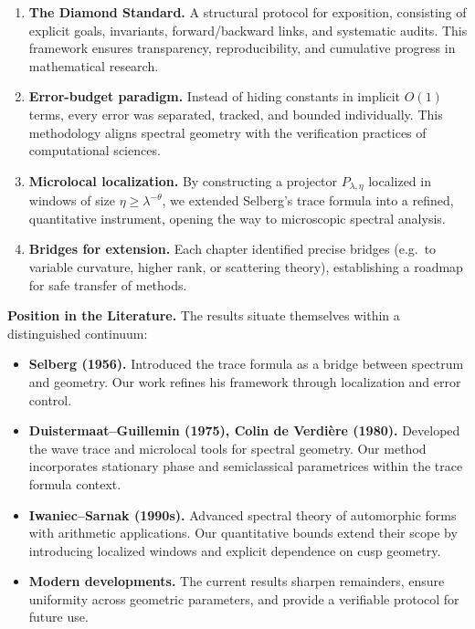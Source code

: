 \begin{enumerate}
  \item \textbf{The Diamond Standard.}  
  A structural protocol for exposition, consisting of explicit goals, invariants, forward/backward links, and systematic audits. This framework ensures transparency, reproducibility, and cumulative progress in mathematical research.

  \item \textbf{Error-budget paradigm.}  
  Instead of hiding constants in implicit $O(1)$ terms, every error was separated, tracked, and bounded individually. This methodology aligns spectral geometry with the verification practices of computational sciences.

  \item \textbf{Microlocal localization.}  
  By constructing a projector $P_{\lambda,\eta}$ localized in windows of size $\eta \ge \lambda^{-\theta}$, we extended Selberg’s trace formula into a refined, quantitative instrument, opening the way to microscopic spectral analysis.

  \item \textbf{Bridges for extension.}  
  Each chapter identified precise bridges (e.g.\ to variable curvature, higher rank, or scattering theory), establishing a roadmap for safe transfer of methods.
\end{enumerate}

\medskip

\noindent\textbf{Position in the Literature.}
The results situate themselves within a distinguished continuum:

\begin{itemize}
  \item \textbf{Selberg (1956).}  
  Introduced the trace formula as a bridge between spectrum and geometry. Our work refines his framework through localization and error control.

  \item \textbf{Duistermaat–Guillemin (1975), Colin de Verdière (1980).}  
  Developed the wave trace and microlocal tools for spectral geometry. Our method incorporates stationary phase and semiclassical parametrices within the trace formula context.

  \item \textbf{Iwaniec–Sarnak (1990s).}  
  Advanced spectral theory of automorphic forms with arithmetic applications. Our quantitative bounds extend their scope by introducing localized windows and explicit dependence on cusp geometry.

  \item \textbf{Modern developments.}  
  The current results sharpen remainders, ensure uniformity across geometric parameters, and provide a verifiable protocol for future use.
\end{itemize}

